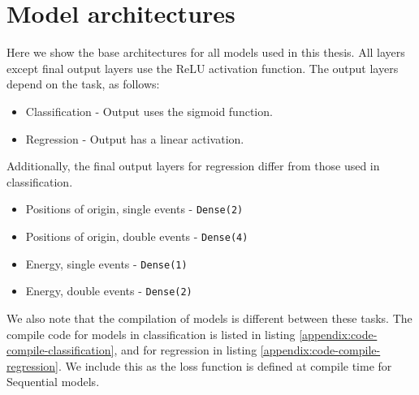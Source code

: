 \section{Model architectures}
Here we show the base architectures for all models used in this thesis.
All layers except final output layers use the ReLU activation function.
The output layers depend on the task, as follows:
\begin{itemize}
    \item Classification - Output uses the sigmoid function.
    \item Regression - Output has a linear activation.
\end{itemize}
Additionally, the final output layers for regression differ from those used in classification.
\begin{itemize}
    \item Positions of origin, single events - \lstinline{Dense(2)}
    \item Positions of origin, double events - \lstinline{Dense(4)}
    \item Energy, single events - \lstinline{Dense(1)}
    \item Energy, double events - \lstinline{Dense(2)}
\end{itemize}
We also note that the compilation of models is different between these tasks.
The compile code for models in classification is listed in listing \ref{appendix:code-compile-classification},
and for regression in listing \ref{appendix:code-compile-regression}. We include this as the loss function is defined
at compile time for Sequential models.








